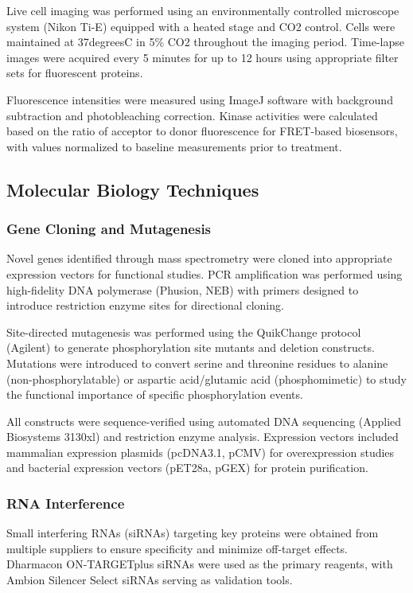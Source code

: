 \documentclass[11pt,a4paper]{article}
\begin{document}
Live cell imaging was performed using an environmentally controlled microscope system (Nikon Ti-E) equipped with a heated stage and CO2 control. Cells were maintained at 37degreesC in 5\% CO2 throughout the imaging period. Time-lapse images were acquired every 5 minutes for up to 12 hours using appropriate filter sets for fluorescent proteins.

Fluorescence intensities were measured using ImageJ software with background subtraction and photobleaching correction. Kinase activities were calculated based on the ratio of acceptor to donor fluorescence for FRET-based biosensors, with values normalized to baseline measurements prior to treatment.

\subsection{Molecular Biology Techniques}

\subsubsection{Gene Cloning and Mutagenesis}

Novel genes identified through mass spectrometry were cloned into appropriate expression vectors for functional studies. PCR amplification was performed using high-fidelity DNA polymerase (Phusion, NEB) with primers designed to introduce restriction enzyme sites for directional cloning.

Site-directed mutagenesis was performed using the QuikChange protocol (Agilent) to generate phosphorylation site mutants and deletion constructs. Mutations were introduced to convert serine and threonine residues to alanine (non-phosphorylatable) or aspartic acid/glutamic acid (phosphomimetic) to study the functional importance of specific phosphorylation events.

All constructs were sequence-verified using automated DNA sequencing (Applied Biosystems 3130xl) and restriction enzyme analysis. Expression vectors included mammalian expression plasmids (pcDNA3.1, pCMV) for overexpression studies and bacterial expression vectors (pET28a, pGEX) for protein purification.

\subsubsection{RNA Interference}

Small interfering RNAs (siRNAs) targeting key proteins were obtained from multiple suppliers to ensure specificity and minimize off-target effects. Dharmacon ON-TARGETplus siRNAs were used as the primary reagents, with Ambion Silencer Select siRNAs serving as validation tools.
\end{document}
